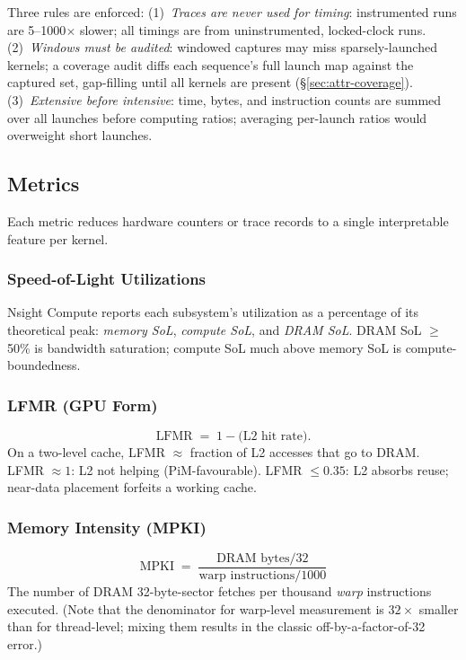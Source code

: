 Three rules are enforced: (1)~\emph{Traces are never used for timing}: instrumented runs are 5--1000$\times$ slower; all timings are from uninstrumented, locked-clock runs. (2)~\emph{Windows must be audited}: windowed captures may miss sparsely-launched kernels; a coverage audit diffs each sequence's full launch map against the captured set, gap-filling until all kernels are present (\S\ref{sec:attr-coverage}). (3)~\emph{Extensive before intensive}: time, bytes, and instruction counts are summed over all launches before computing ratios; averaging per-launch ratios would overweight short launches.

\subsection{Metrics}
\label{sec:met-metrics}

Each metric reduces hardware counters or trace records to a single interpretable feature per kernel.

\subsubsection{Speed-of-Light Utilizations}
Nsight Compute reports each subsystem's utilization as a percentage of its theoretical peak: \emph{memory SoL}, \emph{compute SoL}, and \emph{DRAM SoL}. DRAM SoL $\geq$ 50\% is bandwidth saturation; compute SoL much above memory SoL is compute-boundedness.

\subsubsection{LFMR (GPU Form)}
\begin{equation}
\text{LFMR} \;=\; 1 - \text{(L2 hit rate)}.
\label{eq:lfmr}
\end{equation}
On a two-level cache, LFMR $\approx$ fraction of L2 accesses that go to DRAM. LFMR $\approx 1$: L2 not helping (PiM-favourable). LFMR $\leq 0.35$: L2 absorbs reuse; near-data placement forfeits a working cache.

\subsubsection{Memory Intensity (MPKI)}
\begin{equation}
\text{MPKI} \;=\; \frac{\text{DRAM bytes}/32}{\text{warp instructions}/1000}
\label{eq:mpki}
\end{equation}
The number of DRAM 32-byte-sector fetches per thousand \emph{warp} instructions executed. (Note that the denominator for warp-level measurement is $32\times$ smaller than for thread-level; mixing them results in the classic off-by-a-factor-of-32 error.)

